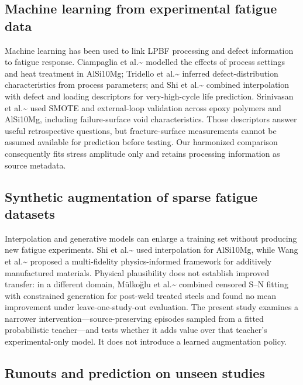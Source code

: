 \documentclass[12pt,a4paper]{article}
\begin{document}
\subsection{Machine learning from experimental fatigue data}

Machine learning has been used to link LPBF processing and defect information to fatigue response. Ciampaglia et al.\textasciitilde{}\cite{ciampaglia2023} modelled the effects of process settings and heat treatment in AlSi10Mg; Tridello et al.\textasciitilde{}\cite{tridello2023b} inferred defect-distribution characteristics from process parameters; and Shi et al.\textasciitilde{}\cite{shi2023} combined interpolation with defect and loading descriptors for very-high-cycle life prediction. Srinivasan et al.\textasciitilde{}\cite{srinivasan2024} used SMOTE and external-loop validation across epoxy polymers and AlSi10Mg, including failure-surface void characteristics. Those descriptors answer useful retrospective questions, but fracture-surface measurements cannot be assumed available for prediction before testing. Our harmonized comparison consequently fits stress amplitude only and retains processing information as source metadata.

\subsection{Synthetic augmentation of sparse fatigue datasets}

Interpolation and generative models can enlarge a training set without producing new fatigue experiments. Shi et al.\textasciitilde{}\cite{shi2023} used interpolation for AlSi10Mg, while Wang et al.\textasciitilde{}\cite{wang2025} proposed a multi-fidelity physics-informed framework for additively manufactured materials. Physical plausibility does not establish improved transfer: in a different domain, Mülkoğlu et al.\textasciitilde{}\cite{mulkoglu2026} combined censored S–N fitting with constrained generation for post-weld treated steels and found no mean improvement under leave-one-study-out evaluation. The present study examines a narrower intervention—source-preserving episodes sampled from a fitted probabilistic teacher—and tests whether it adds value over that teacher’s experimental-only model. It does not introduce a learned augmentation policy.

\subsection{Runouts and prediction on unseen studies}
\end{document}
